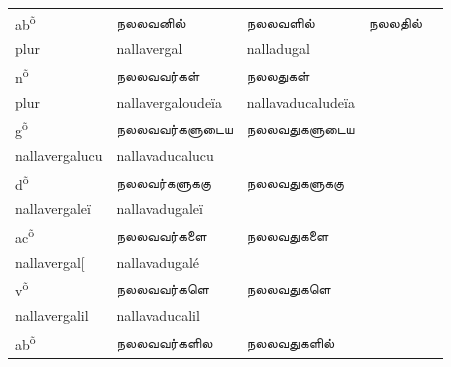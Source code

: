 \documentclass[12pt,a4paper]{scrbook}
\begin{document}
\begin{tabular}{lllll}
          
    
          
            ab\textsuperscript{õ} &
            நலலவனில் &
            நலலவளில் &
            நலலதில் \\
    
          
    
          
            plur &
            nallavergal &
            nalladugal \\
    
          
    
          
            n\textsuperscript{õ} &
            நலலவவர்கள் &
            நலலதுகள் \\
    
          
    
          
            plur &
            nallavergaloudeïa &
            nallavaducaludeïa \\
    
          
    
          
            g\textsuperscript{õ} &
            நலலவவர்களுடைய &
            நலலவதுகளுடைய \\
    
          
    
          
            nallavergalucu &
            nallavaducalucu \\
    
          
    
          
            d\textsuperscript{õ} &
            நலலவர்களுககு &
            நலலவதுகளுககு \\
    
          
    
          
            nallavergaleï &
            nallavadugaleï \\
    
          
    
          
            ac\textsuperscript{õ} &
            நலலவவர்களை &
            நலலவதுகளை \\
    
          
    
          
            nallavergal[ &
            nallavadugalé \\
    
          
    
          
            v\textsuperscript{õ} &
            நலலவவர்களெ &
            நலலவதுகளெ \\
    
          
    
          
            nallavergalil &
            nallavaducalil \\
    
          
    
          
            ab\textsuperscript{õ} &
            நலலவவர்களில &
            நலலவதுகளில் \\
    
          
    
      
\end{tabular}
    
\end{document}
